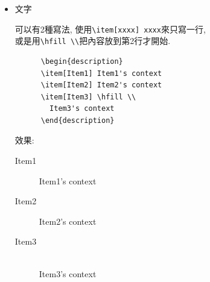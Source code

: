 \begin{itemize}
{\begin{DescriptionFrame}
\begin{verbatim}
      \item Item2

      \item
      {
        Item3

        Item3's context
      }

      \item
      {
        Item4

        Item4's context
      }
      \end{itemize}
    \end{verbatim}
    \end{DescriptionFrame}

    效果:
    \begin{itemize}
      \item Item1

      \item Item2

      \item
      {
        Item3

        Item3's context
      }

      \item
      {
        Item4

        Item4's context
      }
    \end{itemize}
  } %

  \newpage
  \item
  {
    文字

    可以有2種寫法, 使用\verb|\item[xxxx] xxxx|來只寫一行,\\
    或是用\verb|\hfill \\|把內容放到第2行才開始.\\

    \begin{DescriptionFrame}
    \begin{verbatim}
      \begin{description}
      \item[Item1] Item1's context
      \item[Item2] Item2's context
      \item[Item3] \hfill \\
        Item3's context
      \end{description}
    \end{verbatim}
    \end{DescriptionFrame}

    效果:
    \begin{description}
      \item[Item1] Item1's context
      \item[Item2] Item2's context
      \item[Item3] \hfill \\
      Item3's context
    \end{description}
  } %


\end{itemize}

